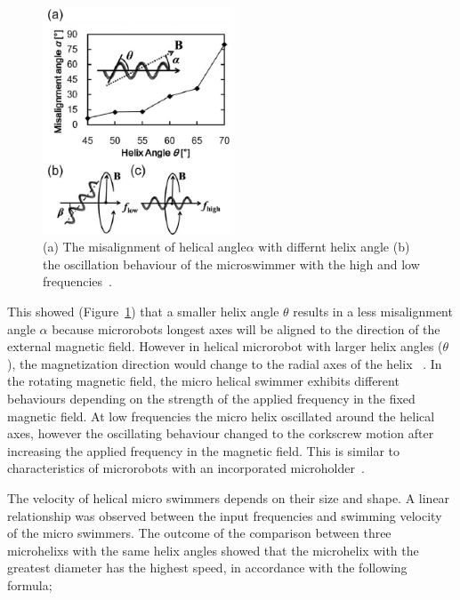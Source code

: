 \documentclass[12pt,a4paper,titlepage]{report}
\begin{document}
\begin{figure}
  \begin{center}
    \includegraphics[width=0.5\textwidth]{7}
  \caption{(a) The misalignment of helical angle$\alpha$ with differnt helix angle (b) the oscillation behaviour
of the microswimmer with the high and low frequencies~\citep{tottori2012magnetic}.}
  \label{ref7}
\end{center}
\end{figure}


This showed (Figure~\ref{ref7}) that a smaller helix angle $\theta$ results in a less misalignment 
angle $\alpha$ because microrobots longest axes will be aligned to the direction of the external magnetic field. 
However in helical microrobot with larger helix angles ($\theta$), the magnetization direction would change to 
the radial axes of the helix  ~\citep{tottori2012magnetic}.
In the rotating magnetic field, the micro helical swimmer exhibits different behaviours depending on 
the strength of the applied frequency in the fixed magnetic field. At low frequencies the micro helix oscillated 
around the helical axes, however the oscillating behaviour changed to the 
corkscrew motion after increasing the applied frequency in the magnetic field. This is similar to characteristics of 
microrobots with an incorporated
 microholder~\citep{tottori2012magnetic}.

The velocity of helical micro swimmers depends on their size and shape. A linear relationship was 
observed between the input frequencies and swimming velocity of the micro swimmers. The outcome of 
the comparison between three microhelixs with the same helix angles showed that the microhelix with the
 greatest diameter has the highest speed, in accordance with the following formula;
\end{document}
